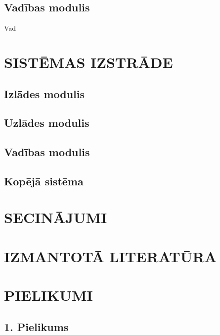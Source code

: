 \documentclass[12pt,fleqn,titlepage,oneside]{article}
\numberwithin{equation}{section}
\numberwithin{figure}{section}
\numberwithin{table}{section}
\begin{document}
\subsection{Vadības modulis}

Vad

\FloatBarrier
\newpage
\section{\texorpdfstring{\MakeUppercase{Sistēmas izstrāde}}{Sistēmas izstrāde}}

\subsection{Izlādes modulis}

\subsection{Uzlādes modulis}

\subsection{Vadības modulis}

\subsection{Kopējā sistēma}

\FloatBarrier
\newpage
\section{\texorpdfstring{\MakeUppercase{Secinājumi}}{Secinājumi}}

\FloatBarrier
\newpage

\section*{\texorpdfstring{\MakeUppercase{Izmantotā literatūra}}{Izmantotā literatūra}}
\printbibliography[heading=none]

\FloatBarrier
\newpage
\vspace*{\fill}

\section*{\centering\texorpdfstring{\MakeUppercase{Pielikumi}}{Pielikumi}}

\vspace*{\fill}
\FloatBarrier
\newpage

\subsection*{1. Pielikums}
\end{document}
